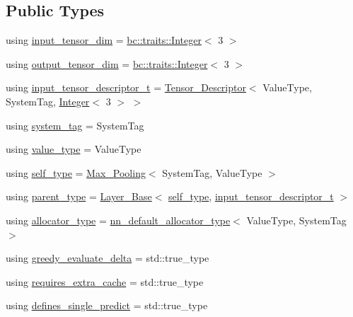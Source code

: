 \subsection*{Public Types}
\begin{DoxyCompactItemize}
\item 
using \hyperlink{structbc_1_1nn_1_1Max__Pooling_a32c0d4c35a7d36fc7381dd21f40372de}{input\+\_\+tensor\+\_\+dim} = \hyperlink{structbc_1_1traits_1_1Integer}{bc\+::traits\+::\+Integer}$<$ 3 $>$
\item 
using \hyperlink{structbc_1_1nn_1_1Max__Pooling_a2b2694a45b89f4d8d73781817f2fa9b1}{output\+\_\+tensor\+\_\+dim} = \hyperlink{structbc_1_1traits_1_1Integer}{bc\+::traits\+::\+Integer}$<$ 3 $>$
\item 
using \hyperlink{structbc_1_1nn_1_1Max__Pooling_aea291f6353c358b1f851b83f0787d782}{input\+\_\+tensor\+\_\+descriptor\+\_\+t} = \hyperlink{structbc_1_1nn_1_1Tensor__Descriptor}{Tensor\+\_\+\+Descriptor}$<$ Value\+Type, System\+Tag, \hyperlink{structbc_1_1traits_1_1Integer}{Integer}$<$ 3 $>$ $>$
\item 
using \hyperlink{structbc_1_1nn_1_1Max__Pooling_a8051bc815bee4d25c7506dbe870b4fca}{system\+\_\+tag} = System\+Tag
\item 
using \hyperlink{structbc_1_1nn_1_1Max__Pooling_ab25ed5aac84aa22b0278f2b9ece6a163}{value\+\_\+type} = Value\+Type
\item 
using \hyperlink{structbc_1_1nn_1_1Max__Pooling_a4cec43dcbb377793bea061155fbbca52}{self\+\_\+type} = \hyperlink{structbc_1_1nn_1_1Max__Pooling}{Max\+\_\+\+Pooling}$<$ System\+Tag, Value\+Type $>$
\item 
using \hyperlink{structbc_1_1nn_1_1Max__Pooling_aaa69267c6421bc73dea542fdf6617cf0}{parent\+\_\+type} = \hyperlink{structbc_1_1nn_1_1Layer__Base}{Layer\+\_\+\+Base}$<$ \hyperlink{structbc_1_1nn_1_1Max__Pooling_a4cec43dcbb377793bea061155fbbca52}{self\+\_\+type}, \hyperlink{structbc_1_1nn_1_1Max__Pooling_aea291f6353c358b1f851b83f0787d782}{input\+\_\+tensor\+\_\+descriptor\+\_\+t} $>$
\item 
using \hyperlink{structbc_1_1nn_1_1Max__Pooling_a7e0efe21cc4544634801342f08b51a04}{allocator\+\_\+type} = \hyperlink{namespacebc_1_1nn_a0025752fc3f47f988b3fae106c825860}{nn\+\_\+default\+\_\+allocator\+\_\+type}$<$ Value\+Type, System\+Tag $>$
\item 
using \hyperlink{structbc_1_1nn_1_1Max__Pooling_aced0066829bfb298110f9de43ef27b93}{greedy\+\_\+evaluate\+\_\+delta} = std\+::true\+\_\+type
\item 
using \hyperlink{structbc_1_1nn_1_1Max__Pooling_a79b30fd356ececeb223371dbed0fa83e}{requires\+\_\+extra\+\_\+cache} = std\+::true\+\_\+type
\item 
using \hyperlink{structbc_1_1nn_1_1Max__Pooling_a5814b6009b1a7591e2ec281fbcc85e0a}{defines\+\_\+single\+\_\+predict} = std\+::true\+\_\+type
\end{DoxyCompactItemize}
